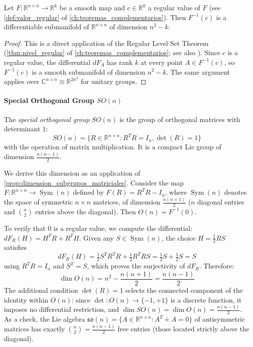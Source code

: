 \begin{proposition}\label{prop:dimension_subgrupos_matriciales}
Let $F: \mathbb{R}^{n \times n} \to \mathbb{R}^k$ be a smooth map and $c \in \mathbb{R}^k$ a regular value of $F$ (see \autoref{def:valor_regular} of \autoref{ch:teoremas_complementarios}). Then $F^{-1}(c)$ is a differentiable submanifold of $\mathbb{R}^{n \times n}$ of dimension $n^2 - k$.
\end{proposition}

\begin{proof}
This is a direct application of the Regular Level Set Theorem (\autoref{thm:nivel_regular} of \autoref{ch:teoremas_complementarios}; see also \citep[Chapter~5]{lee2012introduction}). Since $c$ is a regular value, the differential $dF_A$ has rank $k$ at every point $A \in F^{-1}(c)$, so $F^{-1}(c)$ is a smooth submanifold of dimension $n^2 - k$. The same argument applies over $\mathbb{C}^{n \times n} \cong \mathbb{R}^{2n^2}$ for unitary groups.
\end{proof}

\paragraph{Special Orthogonal Group $SO(n)$}

\begin{definition}\label{def:grupo_so_n}
The \textit{special orthogonal group} $SO(n)$ is the group of orthogonal matrices with determinant $1$:
\begin{equation}
SO(n) = \{R \in \mathbb{R}^{n \times n} : R^T R = I_n, \det(R) = 1\}
\end{equation}
with the operation of matrix multiplication. It is a compact Lie group of dimension $\frac{n(n-1)}{2}$.
\end{definition}

We derive this dimension as an application of \autoref{prop:dimension_subgrupos_matriciales}. Consider the map $F: \mathbb{R}^{n \times n} \to \operatorname{Sym}(n)$ defined by $F(R) = R^T R - I_n$, where $\operatorname{Sym}(n)$ denotes the space of symmetric $n \times n$ matrices, of dimension $\frac{n(n+1)}{2}$ ($n$ diagonal entries and $\binom{n}{2}$ entries above the diagonal). Then $O(n) = F^{-1}(0)$.

To verify that $0$ is a regular value, we compute the differential: $dF_R(H) = H^T R + R^T H$. Given any $S \in \operatorname{Sym}(n)$, the choice $H = \frac{1}{2}RS$ satisfies
\[
	dF_R(H) = \tfrac{1}{2}S^T R^T R + \tfrac{1}{2}R^T R S = \tfrac{1}{2}S + \tfrac{1}{2}S = S
\]
using $R^T R = I_n$ and $S^T = S$, which proves the surjectivity of $dF_R$. Therefore:
\[
	\dim O(n) = n^2 - \frac{n(n+1)}{2} = \frac{n(n-1)}{2}
\]
The additional condition $\det(R) = 1$ selects the connected component of the identity within $O(n)$: since $\det: O(n) \to \{-1, +1\}$ is a discrete function, it imposes no differential restriction, and $\dim SO(n) = \dim O(n) = \frac{n(n-1)}{2}$. As a check, the Lie algebra $\mathfrak{so}(n) = \{A \in \mathbb{R}^{n \times n} : A^T + A = 0\}$ of antisymmetric matrices has exactly $\binom{n}{2} = \frac{n(n-1)}{2}$ free entries (those located strictly above the diagonal).

